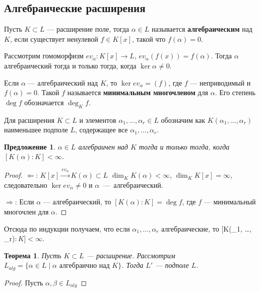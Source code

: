 \documentclass[a4paper]{article}
\newtheorem{theorem}{Теорема}
\numberwithin{theorem}{section}
\numberwithin{lemma}{section}
\newtheorem{proposition}{Предложение}
\numberwithin{proposition}{section}
\numberwithin{corollary}{section}
\begin{document}
\subsection*{Алгебраические расширения}
Пусть $K \subset L$ --- расширение поле, тогда $\alpha \in L$
называется \textbf{алгебраическим} над $K$, если существует ненулевой
$f \in K[x]$, такой что $f(\alpha) = 0$.

Рассмотрим гомоморфизм $ev_\alpha: K[x] \to L$, $ev_\alpha(f(x)) = f(\alpha)$. Тогда $\alpha$ алгебраический тогда и только тогда,
когда $\ker \alpha \ne 0$.

Если $\alpha$ --- алгебраический над $K$, то $\ker ev_\alpha = (f)$,
где $f$ --- неприводимый и $f(\alpha) = 0$. Такой $f$ называется
\textbf{минимальным многочленом} для $\alpha$. Его степень $\deg f$ обозначается $\deg_K f$.

Для расширения $K \subset L$ и
элементов $\alpha_1, \dots, \alpha_r \in L$
обозначим как $K(\alpha_1, \dots, \alpha_r)$ наименьшее подполе $L$,
содержащее все $\alpha_1, \dots, \alpha_r$.

\begin{proposition}
$\alpha \in L$ алгебраичен над $K$ тогда и только тогда,
когда $[K(\alpha) : K] < \infty$.
\end{proposition}
\begin{proof}

$\Leftarrow$: $K[x] \xrightarrow{ev_\alpha} K(\alpha) \subset L$
$\dim_K K(\alpha) < \infty$, $\dim_K K[x] = \infty$, следовательно
$\ker ev_\alpha \ne 0$ и $\alpha$~---~алгебраический.

$\Rightarrow$: Если $\alpha$ --- алгебраический, то $[K(\alpha) : K] = \deg f$, где $f$ --- минимальный многочлен для $\alpha$.
\end{proof}

Отсюда по индукции получаем, что если $\alpha_1, \dots, \alpha_r$ алгебраические, то $[$K(\alpha_1, \dots, \alpha_r)$ : K] < \infty$.

\begin{theorem}
Пусть $K \subset L$ --- расширение.
Рассмотрим $L_{alg} = \{\alpha \in L \mid  \text{$\alpha$ алгебраично над $K$}\}$.
Тогда $L'$ --- подполе $L$.
\end{theorem}
\begin{proof}
Пусть $\alpha, \beta \in L_{alg}$
\end{proof}
\end{document}
